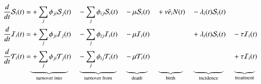 \newcommand{\bracelabel}[2]{%
  \underbrace{\smash{\phantom{#1}}}_{\textrm{#2}}
}
\begin{alignat}{9}
\frac{d}{dt}\mathcal{S}_i(t) &=
      + \sum_j \phi_{ji} \mathcal{S}_j(t)
&&    - \sum_j \phi_{ij} \mathcal{S}_i(t)
&&    - \mu \mathcal{S}_i(t)
&&    + \nu \hat{e}_i N(t)
&&    - \lambda_i(t) \mathcal{S}_i(t)
&&
\label{eq:model-S}\\
\frac{d}{dt}\mathcal{I}_i(t) &=
      + \sum_j \phi_{ji} \mathcal{I}_j(t)
&&    - \sum_j \phi_{ij} \mathcal{I}_i(t)
&&    - \mu \mathcal{I}_i(t)
&&
&&    + \lambda_i(t) \mathcal{S}_i(t)
&&    - \tau \mathcal{I}_i(t)
\label{eq:model-I}\\
\frac{d}{dt}\mathcal{T}_i(t) &=
      + \sum_j \phi_{ji} \mathcal{T}_j(t)
&&    - \sum_j \phi_{ij} \mathcal{T}_i(t)
&&    - \mu \mathcal{T}_i(t)
&& 
&&
&&    + \tau \mathcal{I}_i(t)
\label{eq:model-T}\\[-1em]
&\hphantom{=}
      \bracelabel{+ \sum_j \phi_{ji} \mathcal{S}_j(t)}{turnover into}
&&    \bracelabel{+ \sum_j \phi_{ij} \mathcal{S}_i(t)}{turnover from}
&&    \bracelabel{+ \mu \mathcal{S}_i(t)}{death}
&&    \bracelabel{+ \nu \hat{e}_i N(t)}{birth}
&&    \bracelabel{+ \lambda_i(t) \mathcal{S}_i(t)}{incidence}
&&    \bracelabel{+ \tau \mathcal{I}_i(t)}{treatment}
\nonumber
\end{alignat}
\\